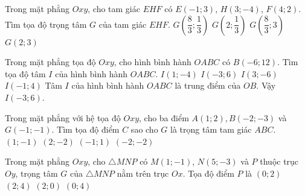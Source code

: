 \begin{ex}%
	Trong mặt phẳng $Oxy$, cho tam giác $EHF$ có $E(-1;3)$, $H(3;-4)$, $F(4;2)$. Tìm tọa độ trọng tâm $G$ của tam giác $EHF$.
	\choice
	{$G\left(\dfrac{8}{3};\dfrac{1}{3}\right)$}
	{\True $G\left(2;\dfrac{1}{3}\right)$}
	{$G\left(\dfrac{8}{3};3\right)$}
	{$G(2;3)$}
\end{ex}

\begin{ex}%
	Trong mặt phẳng tọa độ $Oxy$, cho hình bình hành $OABC$ có $B(-6;12)$. Tìm tọa độ tâm $I$ của hình bình hành $OABC$.
	\choice
	{$I(1;-4)$}
	{\True $I(-3;6)$}
	{$I(3;-6)$}
	{$I(-1;4)$}
	\loigiai
	{
		Tâm $I$ của hình bình hành $OABC$ là trung điểm của $OB$. Vậy $I(-3;6)$.
	}
\end{ex}

\begin{ex}%
	Trong mặt phẳng với hệ tọa độ $Oxy$, cho ba điểm $A(1;2), B(-2;-3)$ và $G(-1;-1)$. Tìm tọa độ điểm $C$ sao cho $G$ là trọng tâm tam giác $ABC$.
	\choice
	{$(1;-1)$}
	{$(2;-2)$}
	{$(-1;1)$}
	{\True $(-2;-2)$}
\end{ex}

\begin{ex}%
	Trong mặt phẳng $Oxy$, cho $\triangle MNP$ có $M(1;-1)$, $N(5;-3)$ và $P$ thuộc trục $Oy$, trọng tâm $G$ của $\triangle MNP$ nằm trên trục $Ox$. Tọa độ điểm $P$ là
	\choice
	{$ (0;2) $}
	{$ (2;4) $}
	{\True $ (2;0) $}
	{$ (0;4) $}
\end{ex}

